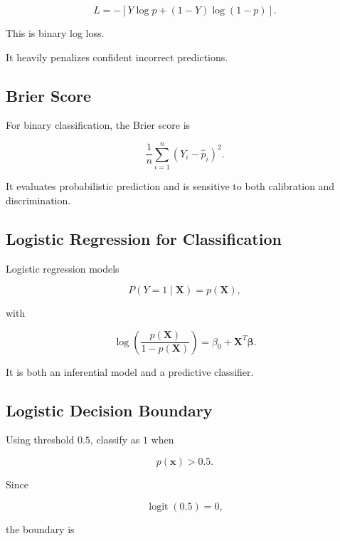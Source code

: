 \[
\boxed{
L
=
-
[
Y\log p
+
(1-Y)\log(1-p)
].
}
\]

This is binary log loss.

It heavily penalizes confident incorrect predictions.

\subsection{Brier Score}
\label{subsec:brier-score-learning}

For binary classification, the Brier score is

\[
\boxed{
\frac1n
\sum_{i=1}^{n}
(
Y_i-\widehat{p}_i
)^2.
}
\]

It evaluates probabilistic prediction and is sensitive to both calibration
and discrimination.

\subsection{Logistic Regression for Classification}
\label{subsec:logistic-regression-learning}

Logistic regression models

\[
\boxed{
P
(
Y=1
\mid
\mathbf{X}
)
=
p(\mathbf{X}),
}
\]

with

\[
\boxed{
\log
\left(
\frac{
p(\mathbf{X})
}{
1-p(\mathbf{X})
}
\right)
=
\beta_0
+
\mathbf{X}^T
\boldsymbol{\beta}.
}
\]

It is both an inferential model and a predictive classifier.

\subsection{Logistic Decision Boundary}
\label{subsec:logistic-decision-boundary}

Using threshold \(0.5\), classify as \(1\) when

\[
p(\mathbf{x})>0.5.
\]

Since

\[
\operatorname{logit}(0.5)=0,
\]

the boundary is

